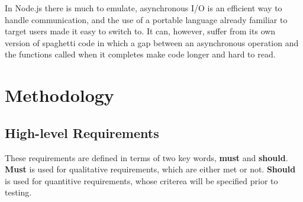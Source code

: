 \documentclass{article}
\begin{document}
In Node.js there is much to emulate, asynchronous I/O is an efficient way to handle communication, and the use of a portable language already familiar to target users made it easy to switch to. It can, however, suffer from its own version of spaghetti code in which a gap between an asynchronous operation and the functions called when it completes make code longer and hard to read.

\section{Methodology}
\subsection{High-level Requirements}
These requirements are defined in terms of two key words, \textbf{must} and \textbf{should}. \textbf{Must} is used for qualitative requirements, which are either met or not. \textbf{Should} is used for quantitive requirements, whose criterea will be specified prior to testing.
\end{document}
